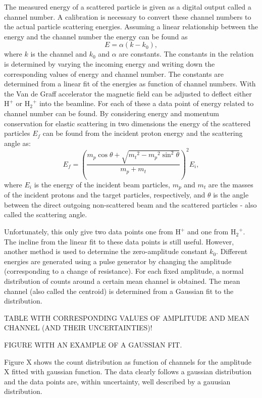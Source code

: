 The measured energy of a scattered particle is given as a digital output called a channel number. A calibration is necessary to convert these channel numbers to the actual particle scattering energies. Assuming a linear relationship between the energy and the channel number the energy can be found as 
\begin{equation}
E = \alpha(k - k_0),
\end{equation}
where $k$ is the channel and $k_0$ and $\alpha$ are constants. The constants in the relation is determined by varying the incoming energy and writing down the corresponding values of energy and channel number. The constants are determined from a linear fit of the energies as function of channel numbers.
With the Van de Graff accelerator the magnetic field can be adjusted to deflect either $\mathrm{H^+}$ or $\mathrm{{H_2}^+}$ into the beamline. For each of these a data point of energy related to channel number can be found. 
By considering energy and momentum conservation for elastic scattering in two dimensions the energy of the scattered particles $E_f$ can be found from the incident proton energy and the scattering angle as: 
\begin{equation}
E_f = \left( \frac{m_p \cos\theta + \sqrt{{m_t}^2 - {m_p}^2 \sin^2\theta}}{m_p+m_t} \right)^2 E_i,
\end{equation}
where $E_i$ is the energy of the incident beam particles, $m_p$ and $m_t$ are the masses of the incident protons and the target particles, respectively, and $\theta$ is the angle between the direct outgoing non-scattered beam and the scattered particles - also called the scattering angle.

Unfortunately, this only give two data points one from $\mathrm{H^+}$ and one from $\mathrm{{H_2}^+}$. The incline from the linear fit to these data points is still useful. However, another method is used to determine the zero-amplitude constant $k_0$. Different energies are generated using a pulse generator by changing the amplitude (corresponding to a change of resistance). For each fixed amplitude, a normal distribution of counts around a certain mean channel is obtained. The mean channel (also called the centroid) is determined from a Gaussian fit to the distribution. 

TABLE WITH CORRESPONDING VALUES OF AMPLITUDE AND MEAN CHANNEL (AND THEIR UNCERTAINTIES)!

FIGURE WITH AN EXAMPLE OF A GAUSSIAN FIT.

Figure X shows the count distribution as function of channels for the amplitude X fitted with gaussian function. The data clearly follows a gaussian distribution and the data points are, within uncertainty, well described by a gauusian distribution. 

